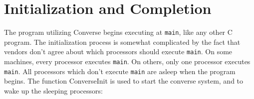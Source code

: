 \chapter{Initialization and Completion}

The program utilizing Converse begins executing at {\tt main}, like
any other C program.  The initialization process is somewhat
complicated by the fact that vendors don't agree about which
processors should execute {\tt main}.  On some machines, every processor
executes {\tt main}.  On others, only one processor executes {\tt
main}.  All processors which don't execute {\tt main} are asleep when
the program begins.  The function ConverseInit is used to start the
converse system, and to wake up the sleeping processors:


